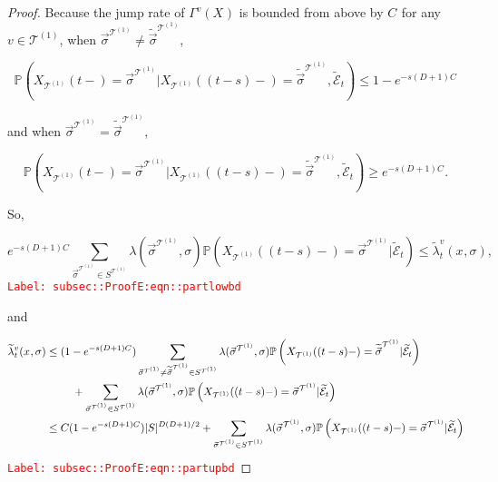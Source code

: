 \documentclass[12pt]{article}
\newcommand{\mb}{\mathbb}
\newcommand{\mc}{\mathcal}
\newcommand{\tr}{\textcolor{red}}
\newcommand{\labe}[1]{\tr{\texttt{Label: #1}}}
\newcommand{\pr}{\mb{P}}							%
\renewcommand{\v}{v}							%
\renewcommand{\S}{S}							%
\newcommand{\s}{\sigma}							%
\newcommand{\sv}{\vec{\s}}						%
\newcommand{\x}{x}								%
\renewcommand{\t}{t}							%
\renewcommand{\tt}{s}							%
\newcommand{\X}{X}								%
\newcommand{\vind}[1]{^{#1}}					%
\newcommand{\carp}[1]{^{#1}}					%
\newcommand{\vsi}[1]{^{#1}}						%
\newcommand{\cind}[1]{_{#1}}					%
\newcommand{\tp}[1]{(#1)}						%
\newcommand{\tip}[1]{#1}						%
\newcommand{\ts}[1]{_{#1}}						%
\newcommand{\const}{C}							%
\newcommand{\degr}{D}							%
\newcommand{\tree}{\mc{T}}						%
\newcommand{\sln}[1]{^{(#1)}}					%
\newcommand{\rate}{\lambda}						%
\newcommand{\alt}[1]{\widetilde{#1}}			%
\newcommand{\indx}[1]{_{#1}}					%
\newcommand{\evnt}{\mc{E}}						%
\newcommand{\pmap}{\Gamma}						%
\newcommand{\crate}{\alt{\lambda}}				%
\begin{document}
\begin{proof}
Because the jump rate of \(\pmap\vind{\v}(\X\cind{}\tip{})\) is bounded from above by \(\const\indx{}\) for any \(\v\in\tree\sln{1}\),  when \(\sv\cind{}\vsi{\tree\sln{1}}\neq\alt{\sv}\cind{}\vsi{\tree\sln{1}}\), 

\[\pr\left(\X\cind{\tree\sln{1}}\tp{\t-} = \sv\cind{}\vsi{\tree\sln{1}}|\X\cind{\tree\sln{1}}\tp{(\t-\tt)-}=\alt{\sv}\cind{}\vsi{\tree\sln{1}},\alt{\evnt}\ts{\t}\right) \leq 1-e^{-\tt(\degr+1)\const\indx{}}\]

and when \(\sv\cind{}\vsi{\tree\sln{1}}=\alt{\sv}\cind{}\vsi{\tree\sln{1}}\),

\[\pr\left(\X\cind{\tree\sln{1}}\tp{\t-} = \sv\cind{}\vsi{\tree\sln{1}}|\X\cind{\tree\sln{1}}\tp{(\t-\tt)-}=\alt{\sv}\cind{}\vsi{\tree\sln{1}},\alt{\evnt}\ts{\t}\right) \geq e^{-\tt(\degr+1)\const\indx{}}.\]

So,

\begin{equation}
e^{-\tt(\degr+1)\const\indx{}}\sum_{\sv\cind{}\vsi{\tree\sln{1}}\in \S\carp{\tree\sln{1}}} \rate(\sv\cind{}\vsi{\tree\sln{1}},\s)\pr\left(\X\cind{\tree\sln{1}}\tp{(\t-\tt)-}=\sv\cind{}\vsi{\tree\sln{1}}|\alt{\evnt}\ts{\t}\right) \leq \crate\vind{\v}\ts{\t}(\x\cind{}\tip{},\s),
\label{subsec::ProofE:eqn::partlowbd}
\end{equation}
\labe{subsec::ProofE:eqn::partlowbd}

and

\begin{align}
\crate\vind{\v}\ts{\t}(\x\cind{}\tip{},\s)&\leq (1 - e^{-\tt(\degr+1)\const\indx{}})\sum_{\sv\cind{}\vsi{\tree\sln{1}}\neq \alt{\sv}\cind{}\vsi{\tree\sln{1}} \in \S\carp{\tree\sln{1}}} \rate(\sv\cind{}\vsi{\tree\sln{1}},\s)\pr\left(\X\cind{\tree\sln{1}}\tp{(\t-\tt)-}=\alt{\sv}\cind{}\vsi{\tree\sln{1}}|\alt{\evnt}\ts{\t}\right)\nonumber\\
&\hspace{24 pt} +\sum_{\sv\cind{}\vsi{\tree\sln{1}} \in \S\carp{\tree\sln{1}}} \rate(\sv\cind{}\vsi{\tree\sln{1}},\s)\pr\left(\X\cind{\tree\sln{1}}\tp{(\t-\tt)-}=\sv\cind{}\vsi{\tree\sln{1}}|\alt{\evnt}\ts{\t}\right)\nonumber\\
&\leq \const\indx{}(1 - e^{-\tt(\degr+1)\const\indx{}})|\S|^{\degr(\degr+1)/2} + \sum_{\sv\cind{}\vsi{\tree\sln{1}} \in \S\carp{\tree\sln{1}}} \rate(\sv\cind{}\vsi{\tree\sln{1}},\s)\pr\left(\X\cind{\tree\sln{1}}\tp{(\t-\tt)-}=\sv\cind{}\vsi{\tree\sln{1}}|\alt{\evnt}\ts{\t}\right)
\label{subsec::ProofE:eqn::partupbd}
\end{align}
\labe{subsec::ProofE:eqn::partupbd}


\end{proof}
\end{document}
